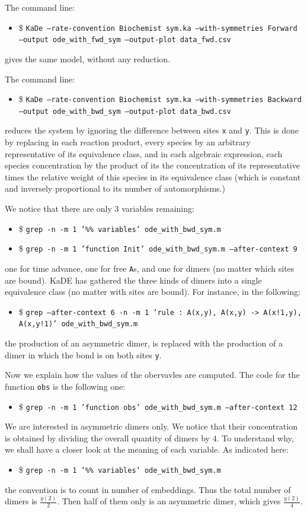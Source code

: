 \documentclass[11pt]{book}
\def\KaDE{\textsf{KaDE}}
\def\ttt#1{\texttt{#1}}
\def\ITE#1{\begin{itemize}#1\end{itemize}}
\begin{document}
The command line:
\ITE{
\item[\$] \ttt{KaDe --rate-convention Biochemist sym.ka --with-symmetries Forward --output ode\_with\_fwd\_sym --output-plot data\_fwd.csv}}
gives the same model, without any reduction.

The command line:
\ITE{
\item[\$] \ttt{KaDe --rate-convention Biochemist sym.ka --with-symmetries Backward --output ode\_with\_bwd\_sym --output-plot data\_bwd.csv}}
reduces the system by ignoring the difference between sites \texttt{x} and \texttt{y}. This is done by replacing in each reaction product, every species by an arbitrary representative of its equivalence class, and in each algebraic expression, each species concentration by the product of its the concentration of its representative times the relative weight of this species in its equivalence class (which is constant and inversely proportional to its number of automorphisms.)

We notice that there are only $3$ variables remaining:
\ITE{
\item[\$] \ttt{grep -n -m 1 '\%\% variables' ode\_with\_bwd\_sym.m}}

\ITE{
\item[\$] \ttt{grep -n -m 1 'function Init' ode\_with\_bwd\_sym.m --after-context 9 }}

one for time advance, one for free \texttt{A}{}s, and one for dimers (no matter which sites are bound). {\KaDE} has gathered the three kinds of dimers into a single equivalence class (no matter with sites are bound).  For instance, in the following:
\ITE{
\item[\$] \ttt{grep --after-context 6 -n -m 1 'rule    : A(x,y), A(x,y) -> A(x!1,y), A(x,y!1)' ode\_with\_bwd\_sym.m }}

 the production of an asymmetric dimer, is replaced with the production of a dimer in which the bond is on both sites \texttt{y}.

Now we explain how the values of the obervavles are computed.
The code for the function \texttt{obs} is the following one:
\ITE{
\item[\$] \ttt{grep -n -m 1 'function obs' ode\_with\_bwd\_sym.m --after-context 12}}

 We are interested in asymmetric dimers only. We notice that their concentration is obtained by dividing the overall quantity of dimers by $4$. To understand why, we shall have a closer look at the meaning of each variable. As indicated here:
\ITE{
\item[\$] \ttt{grep -n -m 1 '\%\% variables' ode\_with\_bwd\_sym.m}}

the convention is to count in number of embeddings. Thus the total number of dimers is $\frac{y(2)}{2}$. Then half of them only is an asymmetric dimer, which gives $\frac{y(2)}{4}$.
\end{document}
